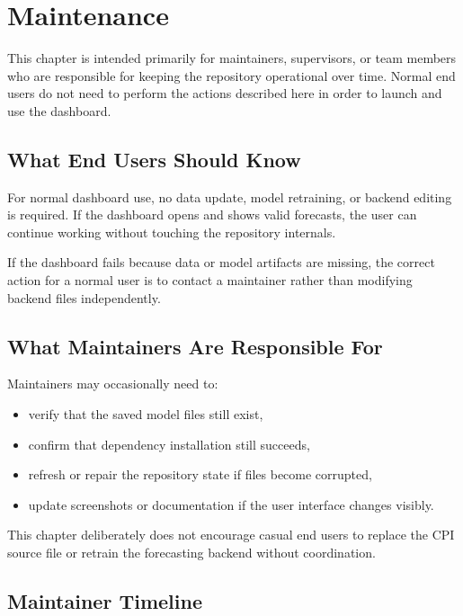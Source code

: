 %
%

\chapter{Maintenance}
\label{ch:maintenance}

This chapter is intended primarily for maintainers, supervisors, or team members who are responsible for keeping the repository operational over time. Normal end users do not need to perform the actions described here in order to launch and use the dashboard.

\section{What End Users Should Know}

For normal dashboard use, no data update, model retraining, or backend editing is required. If the dashboard opens and shows valid forecasts, the user can continue working without touching the repository internals.

If the dashboard fails because data or model artifacts are missing, the correct action for a normal user is to contact a maintainer rather than modifying backend files independently.

\section{What Maintainers Are Responsible For}

Maintainers may occasionally need to:

\begin{itemize}
    \item verify that the saved model files still exist,
    \item confirm that dependency installation still succeeds,
    \item refresh or repair the repository state if files become corrupted,
    \item update screenshots or documentation if the user interface changes visibly.
\end{itemize}

This chapter deliberately does not encourage casual end users to replace the CPI source file or retrain the forecasting backend without coordination.

\section{Maintainer Timeline}

